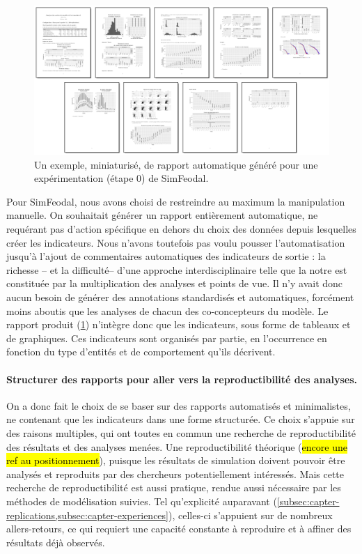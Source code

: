 \begin{figure}[H]
	\captionsetup{width=\linewidth}
	\includegraphics[width=\linewidth]{img/SimFeodal_Rapport_exemple.png}
	\caption{Un exemple, miniaturisé, de rapport automatique généré pour une expérimentation (étape 0) de SimFeodal.}
	\label{fig:simfeodal_rapport_mini}
\end{figure}

Pour SimFeodal, nous avons choisi de restreindre au maximum la manipulation manuelle.
On souhaitait générer un rapport entièrement automatique, ne requérant pas d'action spécifique en dehors du choix des données depuis lesquelles créer les indicateurs.
Nous n'avons toutefois pas voulu pousser l'automatisation jusqu'à l'ajout de commentaires automatiques des indicateurs de sortie :
	la richesse -- et la difficulté-- d'une approche interdisciplinaire telle que la notre est constituée par la multiplication des analyses et points de vue.
Il n'y avait donc aucun besoin de générer des annotations standardisés et automatiques, forcément moins aboutis que les analyses de chacun des co-concepteurs du modèle.
Le rapport produit (\cref{fig:simfeodal_rapport_mini}) n'intègre donc que les indicateurs, sous forme de tableaux et de graphiques.
Ces indicateurs sont organisés par partie, en l'occurrence en fonction du type d'entités et de comportement qu'ils décrivent.

\paragraph{Structurer des rapports pour aller vers la reproductibilité des analyses.}

On a donc fait le choix de se baser sur des rapports automatisés et minimalistes, ne contenant que les indicateurs dans une forme structurée.
Ce choix s'appuie sur des raisons multiples, qui ont toutes en commun une recherche de reproductibilité des résultats et des analyses menées.
Une reproductibilité théorique (\hl{encore une ref au positionnement}), puisque les résultats de simulation doivent pouvoir être analysés et reproduits par des chercheurs potentiellement intéressés.
Mais cette recherche de reproductibilité est aussi pratique, rendue aussi nécessaire par les méthodes de modélisation suivies.
Tel qu'explicité auparavant (\cref{subsec:capter-replications,subsec:capter-experiences}), celles-ci s'appuient sur de nombreux allers-retours, ce qui requiert une capacité constante à reproduire et à affiner des résultats déjà observés.

